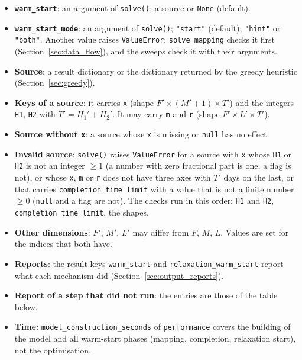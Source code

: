 \begin{itemize}[nosep,leftmargin=1.5em]
  \item \textbf{\texttt{warm\_start}}: an argument of \texttt{solve()}; a source or \texttt{None} (default).
  \item \textbf{\texttt{warm\_start\_mode}}: an argument of \texttt{solve()}; \texttt{"start"} (default), \texttt{"hint"} or \texttt{"both"}. Another value raises \texttt{ValueError}; \texttt{solve\_mapping} checks it first (Section~\ref{sec:data_flow}), and the sweeps check it with their arguments.
  \item \textbf{Source}: a result dictionary or the dictionary returned by the greedy heuristic (Section~\ref{sec:greedy}).
  \item \textbf{Keys of a source}: it carries \texttt{x} (shape $F' \times (M'+1) \times T'$) and the integers \texttt{H1}, \texttt{H2} with $T' = H_1' + H_2'$. It may carry \texttt{m} and \texttt{r} (shape $F' \times L' \times T'$).
  \item \textbf{Source without \texttt{x}}: a source whose \texttt{x} is missing or \texttt{null} has no effect.
  \item \textbf{Invalid source}: \texttt{solve()} raises \texttt{ValueError} for a source with \texttt{x} whose \texttt{H1} or \texttt{H2} is not an integer $\ge 1$ (a number with zero fractional part is one, a flag is not), or whose \texttt{x}, \texttt{m} or \texttt{r} does not have three axes with $T'$ days on the last, or that carries \texttt{completion\_time\_limit} with a value that is not a finite number $\ge 0$ (\texttt{null} and a flag are not). The checks run in this order: \texttt{H1} and \texttt{H2}, \texttt{completion\_time\_limit}, the shapes.
  \item \textbf{Other dimensions}: $F'$, $M'$, $L'$ may differ from $F$, $M$, $L$. Values are set for the indices that both have.
  \item \textbf{Reports}: the result keys \texttt{warm\_start} and \texttt{relaxation\_warm\_start} report what each mechanism did (Section~\ref{sec:output_reports}).
  \item \textbf{Report of a step that did not run}: the entries are those of the table below.
  \item \textbf{Time}: \texttt{model\_construction\_seconds} of \texttt{performance} covers the building of the model and all warm-start phases (mapping, completion, relaxation start), not the optimisation.
\end{itemize}
